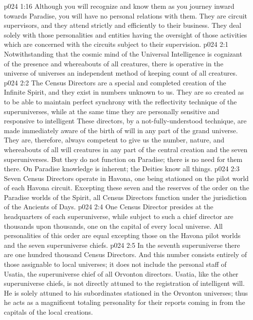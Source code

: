 \vs p024 1:16 Although you will recognize and know them as you journey inward towards Paradise, you will have no personal relations with them. They are circuit supervisors, and they attend strictly and efficiently to their business. They deal solely with those personalities and entities having the oversight of those activities which are concerned with the circuits subject to their supervision.
\vs p024 2:1 Notwithstanding that the cosmic mind of the Universal Intelligence is cognizant of the presence and whereabouts of all  creatures, there is operative in the universe of universes an independent method of keeping count of all  creatures.
\vs p024 2:2 The Census Directors are a special and completed creation of the Infinite Spirit, and they exist in numbers unknown to us. They are so created as to be able to maintain perfect synchrony with the reflectivity technique of the superuniverses, while at the same time they are personally sensitive and responsive to intelligent  These directors, by a not\hyp{}fully\hyp{}understood technique, are made immediately aware of the birth of will in any part of the grand universe. They are, therefore, always competent to give us the number, nature, and whereabouts of all will creatures in any part of the central creation and the seven superuniverses. But they do not function on Paradise; there is no need for them there. On Paradise knowledge is inherent; the Deities know all things.\plusone
\pc \vs p024 2:3 Seven Census Directors operate in Havona, one being stationed on the pilot world of each Havona circuit. Excepting these seven and the reserves of the order on the Paradise worlds of the Spirit, all Census Directors function under the jurisdiction of the Ancients of Days.
\vs p024 2:4 One Census Director presides at the headquarters of each superuniverse, while subject to such a chief director are thousands upon thousands, one on the capital of every local universe. All personalities of this order are equal excepting those on the Havona pilot worlds and the seven superuniverse chiefs.
\vs p024 2:5 In the seventh superuniverse there are one hundred thousand Census Directors. And this number consists entirely of those assignable to local universes; it does not include the personal staff of Usatia, the superuniverse chief of all Orvonton directors. Usatia, like the other superuniverse chiefs, is not directly attuned to the registration of intelligent will. He is solely attuned to his subordinates stationed in the Orvonton universes; thus he acts as a magnificent totaling personality for their reports coming in from the capitals of the local creations.

